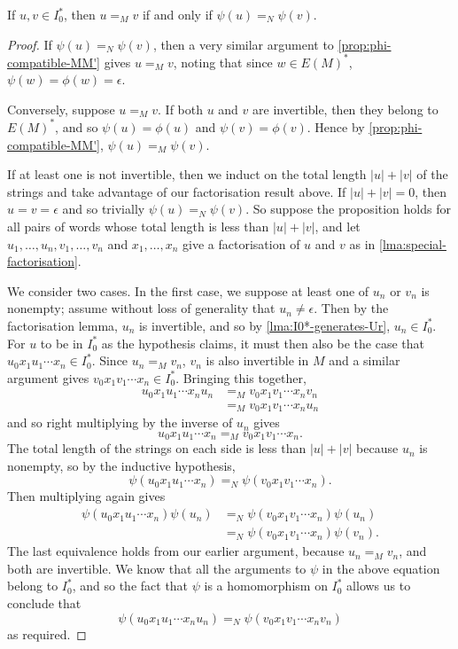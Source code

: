 \documentclass[noindex,noinsetproof,12pt]{lmaths}
\begin{document}
\begin{prop}
	If $u, v \in I_0^*$, then $u =_M v$ if and only if $\psi(u) =_N \psi(v)$. \label{prop:psi-MN-compatible}
\end{prop}
\begin{proof}
	If $\psi(u) =_N \psi(v)$, then a very similar argument to \cref{prop:phi-compatible-MM'} gives $u =_M v$, noting that since $w \in E(M)^*$, $\psi(w) = \phi(w) = \epsilon$.

	Conversely, suppose $u =_M v$. If both $u$ and $v$ are invertible, then they belong to $E(M)^*$, and so $\psi(u) = \phi(u)$ and $\psi(v) = \phi(v)$. Hence by \cref{prop:phi-compatible-MM'}, $\psi(u) =_M \psi(v)$.

	If at least one is not invertible, then we induct on the total length $|u| + |v|$ of the strings and take advantage of our factorisation result above. If $|u|+|v| = 0$, then $u = v = \epsilon$ and so trivially $\psi(u) =_N \psi(v)$. So suppose the proposition holds for all pairs of words whose total length is less than $|u| + |v|$, and let $u_1, \ldots, u_n, v_1, \ldots, v_n$ and $x_1, \ldots, x_n$ give a factorisation of $u$ and $v$ as in \cref{lma:special-factorisation}.

	We consider two cases. In the first case, we suppose at least one of $u_n$ or $v_n$ is nonempty; assume without loss of generality that $u_n \ne \epsilon$. Then by the factorisation lemma, $u_n$ is invertible, and so by \cref{lma:I0*-generates-Ur}, $u_n \in I_0^*$. For $u$ to be in $I_0^*$ as the hypothesis claims, it must then also be the case that $u_0x_1u_1\cdots x_n \in I_0^*$. Since $u_n =_M v_n$, $v_n$ is also invertible in $M$ and a similar argument gives $v_0x_1v_1\cdots x_n \in I_0^*$. Bringing this together,
	\begin{align*}
		u_0x_1u_1 \cdots x_n u_n &=_M v_0x_1v_1\cdots x_n v_n \\
		&=_M v_0x_1v_1\cdots x_n u_n
	\end{align*}
	and so right multiplying by the inverse of $u_n$ gives
		\[ u_0x_1u_1 \cdots x_n =_M v_0x_1v_1\cdots x_n. \]
	The total length of the strings on each side is less than $|u| + |v|$ because $u_n$ is nonempty, so by the inductive hypothesis,
		\[ \psi(u_0x_1u_1 \cdots x_n) =_N \psi(v_0x_1v_1\cdots x_n). \]
	Then multiplying again gives
	\begin{align*}
		\psi(u_0x_1u_1 \cdots x_n)\psi(u_n) &=_N \psi(v_0x_1v_1\cdots x_n)\psi(u_n) \\
		&=_N \psi(v_0x_1v_1\cdots x_n)\psi(v_n).
	\end{align*}
	The last equivalence holds from our earlier argument, because $u_n =_M v_n$, and both are invertible. We know that all the arguments to $\psi$ in the above equation belong to $I_0^*$, and so the fact that $\psi$ is a homomorphism on $I_0^*$ allows us to conclude that
	\[ \psi(u_0x_1u_1 \cdots x_n u_n) =_N \psi(v_0 x_1 v_1 \cdots x_n v_n) \]
	as required.


\end{proof}
\end{document}
